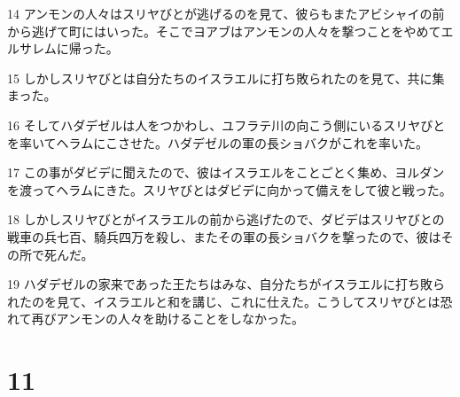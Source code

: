 \par 14 アンモンの人々はスリヤびとが逃げるのを見て、彼らもまたアビシャイの前から逃げて町にはいった。そこでヨアブはアンモンの人々を撃つことをやめてエルサレムに帰った。
\par 15 しかしスリヤびとは自分たちのイスラエルに打ち敗られたのを見て、共に集まった。
\par 16 そしてハダデゼルは人をつかわし、ユフラテ川の向こう側にいるスリヤびとを率いてヘラムにこさせた。ハダデゼルの軍の長ショバクがこれを率いた。
\par 17 この事がダビデに聞えたので、彼はイスラエルをことごとく集め、ヨルダンを渡ってヘラムにきた。スリヤびとはダビデに向かって備えをして彼と戦った。
\par 18 しかしスリヤびとがイスラエルの前から逃げたので、ダビデはスリヤびとの戦車の兵七百、騎兵四万を殺し、またその軍の長ショバクを撃ったので、彼はその所で死んだ。
\par 19 ハダデゼルの家来であった王たちはみな、自分たちがイスラエルに打ち敗られたのを見て、イスラエルと和を講じ、これに仕えた。こうしてスリヤびとは恐れて再びアンモンの人々を助けることをしなかった。

\chapter{11}

